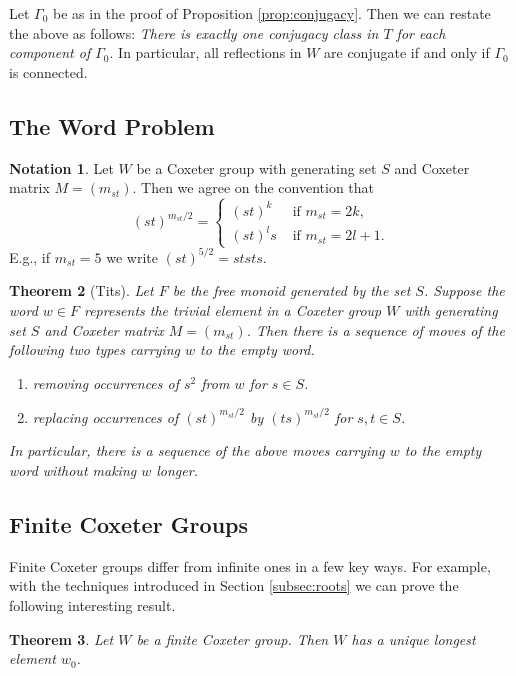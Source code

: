 \documentclass{article}
\newtheorem{theorem}{Theorem}[section]
\theoremstyle{definition}
\newtheorem{notation}[theorem]{Notation}
\begin{document}
Let $\Gamma_0$ be as in the proof of Proposition \ref{prop:conjugacy}. Then we can restate the above as follows: \textit{There is exactly one conjugacy class in $T$ for each component of $\Gamma_0$}. In particular, all reflections in $W$ are conjugate if and only if $\Gamma_0$ is connected.

\subsection{The Word Problem}
\begin{notation}
Let $W$ be a Coxeter group with generating set $S$ and Coxeter matrix $M = (m_{st})$. Then we agree on the convention that
$$(st)^{m_{st}/2} =  \begin{cases}
(st)^k & \text{ if } m_{st} = 2k, \\
(st)^ls & \text{ if } m_{st} = 2l + 1.
\end{cases}$$
E.g., if $m_{st}=5$ we write $(st)^{5/2} = ststs$. 
\end{notation}

\begin{theorem}[Tits]\label{thm:word-problem}
Let $F$ be the free monoid generated by the set $S$. Suppose the word $w \in F$ represents the trivial element in a Coxeter group $W$ with generating set $S$ and Coxeter matrix $M = (m_{st})$. Then there is a sequence of moves of the following two types carrying $w$ to the empty word.

\begin{enumerate}
\setlength\itemsep{0em}
\item removing occurrences of $s^2$ from $w$ for $s \in S$.
\item replacing occurrences of $(st)^{m_{st}/2}$ by $(ts)^{m_{st}/2}$ for $s, t \in S$.
\end{enumerate}
In particular, there is a sequence of the above moves carrying $w$ to the empty word without making $w$ longer.
\end{theorem}

\subsection{Finite Coxeter Groups}
Finite Coxeter groups differ from infinite ones in a few key ways. For example, with the techniques introduced in Section \ref{subsec:roots} we can prove the following interesting result.

\begin{theorem}
Let $W$ be a finite Coxeter group. Then $W$ has a unique longest element $w_0$.
\end{theorem}
\end{document}
